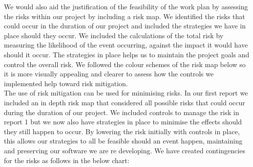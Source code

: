 We would also aid the justification of the feasibility of the  work plan by assessing the risks within our project by including a risk map. We identified the risks that could occur in the duration of our project and included the strategies we have in place should they occur. We included the calculations of the total risk by measuring the likelihood of the event occurring, against the impact it would have should it occur. The strategies in place helps us to maintain the project goals and control the overall risk. We followed the colour schemes of the risk map below so it is more visually appealing and clearer to assess how the controls we implemented help toward risk mitigation. \\


The use of risk mitigation can be used for minimising risks. In our first report we included an in depth risk map that considered all possible risks that could occur during the duration of our project. We included controls to manage the risk in report 1 but we now also have strategies in place to minimise the effects should they still happen to occur. By lowering the risk initially with controls in place, this allows our strategies to all be feasible should an event happen, maintaining and preserving our software we are re developing. We have created contingencies for the risks as follows in the below chart: \\   

 



